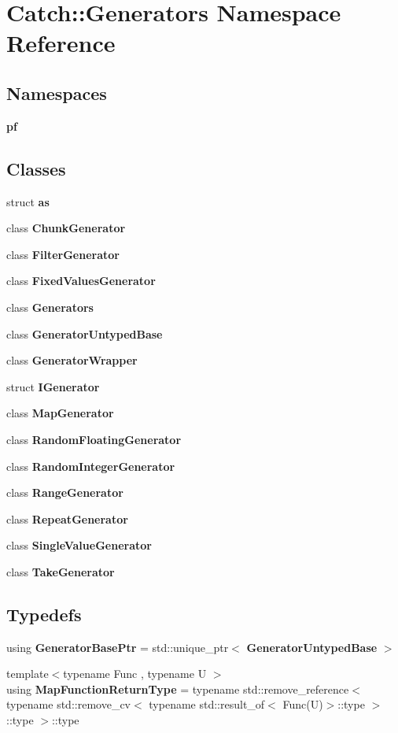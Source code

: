\section{Catch\+::Generators Namespace Reference}
\label{namespace_catch_1_1_generators}
\subsection*{Namespaces}
\begin{DoxyCompactItemize}
\item 
 \textbf{ pf}
\end{DoxyCompactItemize}
\subsection*{Classes}
\begin{DoxyCompactItemize}
\item 
struct \textbf{ as}
\item 
class \textbf{ Chunk\+Generator}
\item 
class \textbf{ Filter\+Generator}
\item 
class \textbf{ Fixed\+Values\+Generator}
\item 
class \textbf{ Generators}
\item 
class \textbf{ Generator\+Untyped\+Base}
\item 
class \textbf{ Generator\+Wrapper}
\item 
struct \textbf{ I\+Generator}
\item 
class \textbf{ Map\+Generator}
\item 
class \textbf{ Random\+Floating\+Generator}
\item 
class \textbf{ Random\+Integer\+Generator}
\item 
class \textbf{ Range\+Generator}
\item 
class \textbf{ Repeat\+Generator}
\item 
class \textbf{ Single\+Value\+Generator}
\item 
class \textbf{ Take\+Generator}
\end{DoxyCompactItemize}
\subsection*{Typedefs}
\begin{DoxyCompactItemize}
\item 
using \textbf{ Generator\+Base\+Ptr} = std\+::unique\+\_\+ptr$<$ \textbf{ Generator\+Untyped\+Base} $>$
\item 
{\footnotesize template$<$typename Func , typename U $>$ }\\using \textbf{ Map\+Function\+Return\+Type} = typename std\+::remove\+\_\+reference$<$ typename std\+::remove\+\_\+cv$<$ typename std\+::result\+\_\+of$<$ Func(U)$>$\+::type $>$\+::type $>$\+::type
\end{DoxyCompactItemize}
